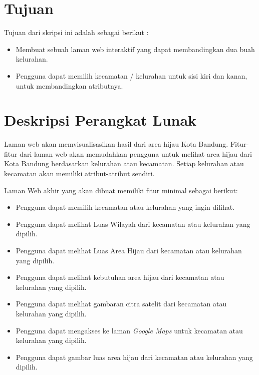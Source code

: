 \documentclass[a4paper,twoside]{article}
\begin{document}
\section{Tujuan}
Tujuan dari skripsi ini adalah sebagai berikut :
\begin{itemize}
	\item Membuat sebuah laman web interaktif yang dapat membandingkan dua buah kelurahan.
	\item Pengguna dapat memilih kecamatan / kelurahan untuk sisi kiri dan kanan, untuk membandingkan atributnya.
\end{itemize}

\section{Deskripsi Perangkat Lunak}
Laman web akan memvisualisasikan hasil dari area hijau Kota Bandung. Fitur-fitur dari laman web akan memudahkan pengguna untuk melihat area hijau dari Kota Bandung berdasarkan kelurahan atau kecamatan. Setiap kelurahan atau kecamatan akan memiliki atribut-atribut sendiri.

Laman Web akhir yang akan dibuat memiliki fitur minimal sebagai berikut:
\begin{itemize}
	\item Pengguna dapat memilih kecamatan atau kelurahan yang ingin dilihat.
	\item Pengguna dapat melihat Luas Wilayah dari kecamatan atau kelurahan yang dipilih.
	\item Pengguna dapat melihat Luas Area Hijau dari kecamatan atau kelurahan yang dipilih.
	\item Pengguna dapat melihat kebutuhan area hijau dari kecamatan atau kelurahan yang dipilih.
	\item Pengguna dapat melihat gambaran citra satelit dari kecamatan atau kelurahan yang dipilih.
	\item Pengguna dapat mengakses ke laman \emph{Google Maps} untuk kecamatan atau kelurahan yang dipilih.
	\item Pengguna dapat gambar luas area hijau dari kecamatan atau kelurahan yang dipilih.
		
\end{itemize}
\end{document}
